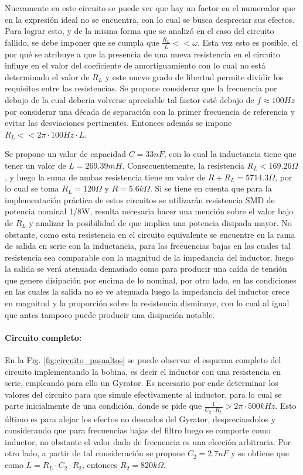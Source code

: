 Nuevamente en este circuito se puede ver que hay un factor en el numerador que en la expresi\'on ideal no se encuentra, con lo cual se busca despreciar sus efectos. Para lograr esto, y de la misma forma que se analiz\'o en el caso del circuito fallido,
se debe imponer que se cumpla que $\frac{R_L}{L} << \omega$. Esta vez esto es posible, el por qu\'e se atribuye a que la presencia de una nueva resistencia en el circuito influye en el valor del coeficiente de amortiguamiento con lo cual no est\'a determinado
el valor de $R_L$ y este nuevo grado de libertad permite dividir los requisitos entre las resistencias. Se propone considerar que la frecuencia por debajo de la cual deberia volverse apreciable tal factor est\'e debajo de $f \approx 100Hz$ por considerar una d\'ecada
de separaci\'on con la primer frecuencia de referencia y evitar las desviaciones pertinentes. Entonces adem\'as se impone $R_L << 2\pi \cdot 100Hz \cdot L$.

Se propone un valor de capacidad $C = 33nF$, con lo cual la inductancia tiene que tener un valor de $L = 269.39mH$. Consecuentemente, la resistencia $R_L < 169.26 \Omega$, y luego la suma de ambas resistencia
tiene un valor de $R + R_L = 5714.3 \Omega$, por lo cual se toma $R_L = 120 \Omega$ y $R = 5.6k\Omega$. Si se tiene en cuenta que para la implementaci\'on pr\'actica de estos circuitos se utilizar\'an resistencia SMD
de potencia nominal 1/8W, resulta necesaria hacer una menci\'on sobre el valor bajo de $R_L$ y analizar la posibilidad de que implica una potencia disipada mayor. No obstante, como esta resistencia en el circuito equivalente se encuentre en la rama de 
salida en serie con la inductancia, para las frecuencias bajas en las cuales tal resistencia sea comparable con la magnitud de la impedancia del inductor, luego la salida se ver\'a atenuada demasiado como para producir una ca\'ida de tensi\'on que genere disipaci\'on
por encima de lo nominal, por otro lado, en las condiciones en las cuales la salida no se ve atenuada luego la impedancia del inductor crece en magnitud y la proporci\'on sobre la resistencia disminuye, con lo cual al igual que antes tampoco puede producir una disipaci\'on notable.

\paragraph*{Circuito completo:} En la Fig. \ref{fig:circuito_pasaaltos} se puede observar el esquema completo del circuito implementando la bobina, es decir el inductor con una resistencia en serie, empleando para ello un Gyrator.
Es necesario por ende determinar los valores del circuito para que simule efectivamente al inductor, para lo cual se parte inicialmente de una condici\'on, donde se pide que $\frac{1}{C_2 \cdot R_L} > 2 \pi \cdot 500kHz$. Esto \'ultimo es para alejar los efectos no deseados del Gyrator, despreciandolos
y considerando que para frecuencias bajas del filtro luego se comporte como inductor, no obstante el valor dado de frecuencia es una elecci\'on arbitraria. Por otro lado, a partir de tal consideraci\'on se propone $C_2 = 2.7nF$ y se obtiene que como $L = R_L \cdot C_2 \cdot R_2$, entonces $R_2 = 820k\Omega$.

